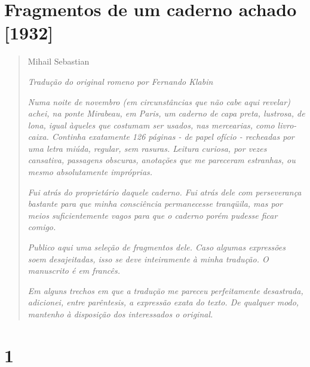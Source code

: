 \section{Fragmentos de um caderno achado
{[}1932{]}}\label{fragmentos-de-um-caderno-achado-1932}

\begin{quote}
Mihail Sebastian

\emph{Tradução do original romeno por Fernando Klabin}

\emph{Numa noite de novembro (em circunstâncias que não cabe aqui
revelar) achei, na ponte Mirabeau, em Paris, um caderno de capa preta,
lustrosa, de lona, igual àqueles que costumam ser usados, nas
mercearias, como livro-caixa. Continha exatamente 126 páginas - de papel
ofício - recheadas por uma letra miúda, regular, sem rasuras. Leitura
curiosa, por vezes cansativa, passagens obscuras, anotações que me
pareceram estranhas, ou mesmo absolutamente impróprias.}

\emph{Fui atrás do proprietário daquele caderno. Fui atrás dele com
perseverança bastante para que minha consciência permanecesse tranqüila,
mas por meios suficientemente vagos para que o caderno porém pudesse
ficar comigo.}

\emph{Publico aqui uma seleção de fragmentos dele. Caso algumas
expressões soem desajeitadas, isso se deve inteiramente à minha
tradução. O manuscrito é em francês.}

\emph{Em alguns trechos em que a tradução me pareceu perfeitamente
desastrada, adicionei, entre parêntesis, a expressão exata do texto. De
qualquer modo, mantenho à disposição dos interessados o original.}
\end{quote}

\section{1}\label{section}

